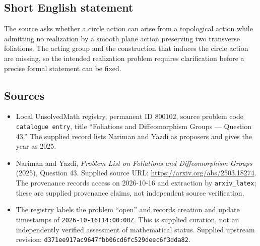 \documentclass[11pt]{article}
\begin{document}
\subsection{Short English statement}
The source asks whether a circle action can arise from a topological action while admitting no realization by a smooth plane action preserving two transverse foliations. The acting group and the construction that induces the circle action are missing, so the intended realization problem requires clarification before a precise formal statement can be fixed.
\subsection{Sources}
\begin{itemize}
\item Local UnsolvedMath registry, permanent ID \(800102\), source problem code \texttt{catalogue entry}, title ``Foliations and Diffeomorphism Groups --- Question 43.'' The supplied record lists Nariman and Yazdi as proposers and gives the year as 2025.
\item Nariman and Yazdi, \emph{Problem List on Foliations and Diffeomorphism Groups} (2025), Question 43. Supplied source URL: \url{https://arxiv.org/abs/2503.18274}. The provenance records access on 2026-10-16 and extraction by \texttt{arxiv\_latex}; these are supplied provenance claims, not independent source verification.
\item The registry labels the problem ``open'' and records creation and update timestamps of \texttt{2026-10-16T14:00:00Z}. This is supplied curation, not an independently verified assessment of mathematical status. Supplied upstream revision: \texttt{d371ee917ac9647fbb06cd6fc529deec6f3dda82}.
\end{itemize}
\end{document}

